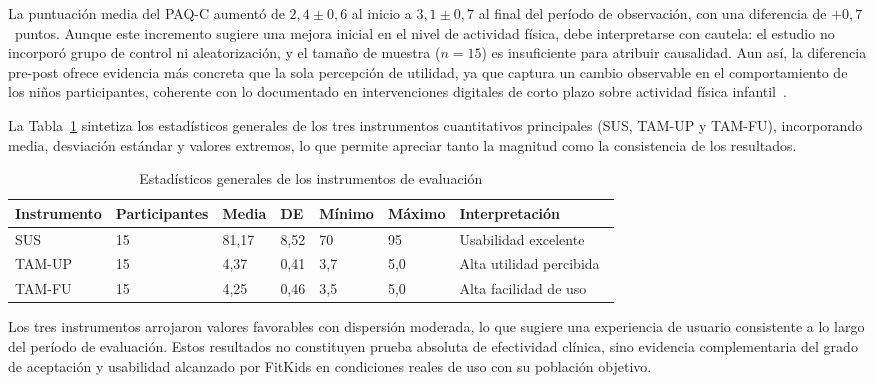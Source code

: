 				La puntuación media del PAQ-C aumentó de $2{,}4 \pm 0{,}6$ al inicio a $3{,}1 \pm 0{,}7$ al final del período de observación, con una diferencia de $+0{,}7$~puntos. Aunque este incremento sugiere una mejora inicial en el nivel de actividad física, debe interpretarse con cautela: el estudio no incorporó grupo de control ni aleatorización, y el tamaño de muestra ($n = 15$) es insuficiente para atribuir causalidad. Aun así, la diferencia pre-post ofrece evidencia más concreta que la sola percepción de utilidad, ya que captura un cambio observable en el comportamiento de los niños participantes, coherente con lo documentado en intervenciones digitales de corto plazo sobre actividad física infantil~\cite{Domin2022,Schoeppe2017}.
				
				La Tabla~\ref{tab:estadisticos_generales} sintetiza los estadísticos generales de los tres instrumentos cuantitativos principales (SUS, TAM-UP y TAM-FU), incorporando media, desviación estándar y valores extremos, lo que permite apreciar tanto la magnitud como la consistencia de los resultados.
				
				\begin{table}[H]
					\centering\small
					\caption{Estadísticos generales de los instrumentos de evaluación}
					\label{tab:estadisticos_generales}
					\begin{tabular}{p{2.2cm}p{2.2cm}p{1.1cm}p{0.75cm}p{1.3cm}p{1.4cm}p{3.5cm}}
						\hline
						\textbf{Instrumento} & \textbf{Participantes} & \textbf{Media} & \textbf{DE} & \textbf{Mínimo} & \textbf{Máximo} & \textbf{Interpretación}\\
						\hline
						SUS & 15 & 81,17 & 8,52 & 70 & 95 & Usabilidad excelente~\cite{Bangor2008}\\
						TAM-UP & 15 & 4,37 & 0,41 & 3,7 & 5,0 & Alta utilidad percibida~\cite{Venkatesh2003}\\
						TAM-FU & 15 & 4,25 & 0,46 & 3,5 & 5,0 & Alta facilidad de uso~\cite{Venkatesh2003}\\
						\hline
					\end{tabular}
				\end{table}
				\tblnote
				
				Los tres instrumentos arrojaron valores favorables con dispersión moderada, lo que sugiere una experiencia de usuario consistente a lo largo del período de evaluación. Estos resultados no constituyen prueba absoluta de efectividad clínica, sino evidencia complementaria del grado de aceptación y usabilidad alcanzado por FitKids en condiciones reales de uso con su población objetivo.
				
